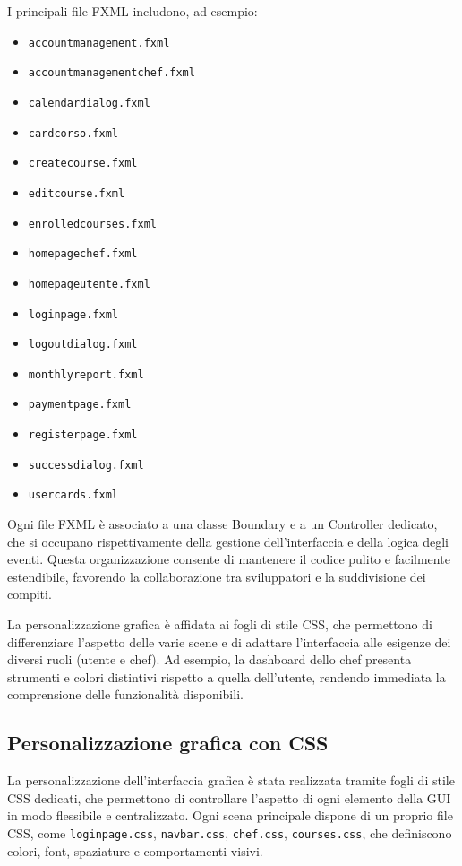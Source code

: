 I principali file FXML includono, ad esempio:
\begin{itemize}
    \item \texttt{accountmanagement.fxml}
    \item \texttt{accountmanagementchef.fxml}
    \item \texttt{calendardialog.fxml}
    \item \texttt{cardcorso.fxml}
    \item \texttt{createcourse.fxml}
    \item \texttt{editcourse.fxml}
    \item \texttt{enrolledcourses.fxml}
    \item \texttt{homepagechef.fxml}
    \item \texttt{homepageutente.fxml}
    \item \texttt{loginpage.fxml}
    \item \texttt{logoutdialog.fxml}
    \item \texttt{monthlyreport.fxml}
    \item \texttt{paymentpage.fxml}
    \item \texttt{registerpage.fxml}
    \item \texttt{successdialog.fxml}
    \item \texttt{usercards.fxml}
\end{itemize}

Ogni file FXML è associato a una classe Boundary e a un Controller dedicato, che si occupano rispettivamente della gestione dell’interfaccia e della logica degli eventi. Questa organizzazione consente di mantenere il codice pulito e facilmente estendibile, favorendo la collaborazione tra sviluppatori e la suddivisione dei compiti.

La personalizzazione grafica è affidata ai fogli di stile CSS, che permettono di differenziare l’aspetto delle varie scene e di adattare l’interfaccia alle esigenze dei diversi ruoli (utente e chef). Ad esempio, la dashboard dello chef presenta strumenti e colori distintivi rispetto a quella dell’utente, rendendo immediata la comprensione delle funzionalità disponibili.

\subsection{Personalizzazione grafica con CSS}
La personalizzazione dell’interfaccia grafica è stata realizzata tramite fogli di stile CSS dedicati, che permettono di controllare l’aspetto di ogni elemento della GUI in modo flessibile e centralizzato. Ogni scena principale dispone di un proprio file CSS, come \texttt{loginpage.css}, \texttt{navbar.css}, \texttt{chef.css}, \texttt{courses.css}, che definiscono colori, font, spaziature e comportamenti visivi.

